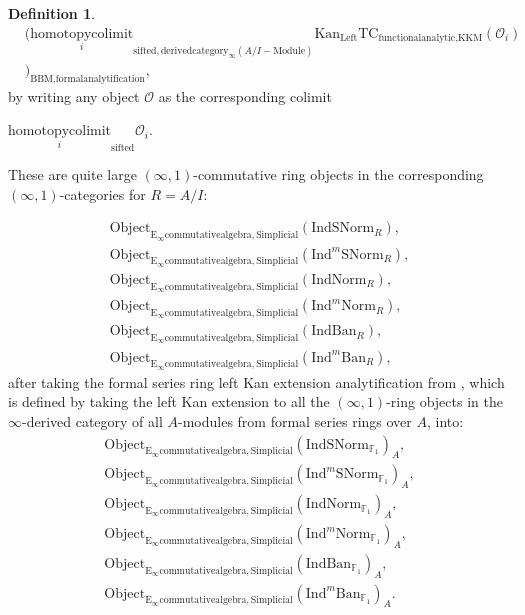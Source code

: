 \documentclass[11pt]{book}
\theoremstyle{definition}
\newtheorem{definition}[theorem]{Definition}
\numberwithin{equation}{section}
\begin{document}
\begin{definition}
\begin{align}
	&(\underset{i}{\text{homotopycolimit}}_{\text{sifted},\text{derivedcategory}_{\infty}(A/I-\text{Module})}\mathrm{Kan}_{\mathrm{Left}}\mathrm{TC}_{\text{functionalanalytic,KKM}}(\mathcal{O}_i)\\
	&)_\text{BBM,formalanalytification},
\end{align}
by writing any object $\mathcal{O}$ as the corresponding colimit 
\begin{center}
$\underset{i}{\text{homotopycolimit}}_\text{sifted}\mathcal{O}_i$.
\end{center}
These are quite large $(\infty,1)$-commutative ring objects in the corresponding $(\infty,1)$-categories for $R=A/I$:

\begin{align}
\mathrm{Object}_{\mathrm{E}_\infty\mathrm{commutativealgebra},\mathrm{Simplicial}}(\mathrm{IndSNorm}_R),\\
\mathrm{Object}_{\mathrm{E}_\infty\mathrm{commutativealgebra},\mathrm{Simplicial}}(\mathrm{Ind}^m\mathrm{SNorm}_R),\\
\mathrm{Object}_{\mathrm{E}_\infty\mathrm{commutativealgebra},\mathrm{Simplicial}}(\mathrm{IndNorm}_R),\\
\mathrm{Object}_{\mathrm{E}_\infty\mathrm{commutativealgebra},\mathrm{Simplicial}}(\mathrm{Ind}^m\mathrm{Norm}_R),\\
\mathrm{Object}_{\mathrm{E}_\infty\mathrm{commutativealgebra},\mathrm{Simplicial}}(\mathrm{IndBan}_R),\\
\mathrm{Object}_{\mathrm{E}_\infty\mathrm{commutativealgebra},\mathrm{Simplicial}}(\mathrm{Ind}^m\mathrm{Ban}_R),
\end{align}
after taking the formal series ring left Kan extension analytification from \cite[Section 4.2]{BBM}, which is defined by taking the left Kan extension to all the $(\infty,1)$-ring objects in the $\infty$-derived category of all $A$-modules from formal series rings over $A$, into:
\begin{align}
\mathrm{Object}_{\mathrm{E}_\infty\mathrm{commutativealgebra},\mathrm{Simplicial}}(\mathrm{IndSNorm}_{\mathbb{F}_1})_A,\\
\mathrm{Object}_{\mathrm{E}_\infty\mathrm{commutativealgebra},\mathrm{Simplicial}}(\mathrm{Ind}^m\mathrm{SNorm}_{\mathbb{F}_1})_A,\\
\mathrm{Object}_{\mathrm{E}_\infty\mathrm{commutativealgebra},\mathrm{Simplicial}}(\mathrm{IndNorm}_{\mathbb{F}_1})_A,\\
\mathrm{Object}_{\mathrm{E}_\infty\mathrm{commutativealgebra},\mathrm{Simplicial}}(\mathrm{Ind}^m\mathrm{Norm}_{\mathbb{F}_1})_A,\\
\mathrm{Object}_{\mathrm{E}_\infty\mathrm{commutativealgebra},\mathrm{Simplicial}}(\mathrm{IndBan}_{\mathbb{F}_1})_A,\\
\mathrm{Object}_{\mathrm{E}_\infty\mathrm{commutativealgebra},\mathrm{Simplicial}}(\mathrm{Ind}^m\mathrm{Ban}_{\mathbb{F}_1})_A.
\end{align}
\end{definition}
\end{document}
